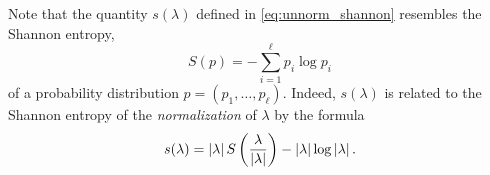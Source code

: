 \documentclass[notitlepage, 10pt]{article}
\begin{document}
\begin{rem}
    Note that the quantity $s(\lambda)$ defined in \cref{eq:unnorm_shannon} resembles the Shannon entropy,
    \begin{equation}
        S(p) = -\sum_{i=1}^{\ell} p_i \log p_i
    \end{equation}
    of a probability distribution $p = (p_1, \ldots, p_\ell)$.
    Indeed, $s(\lambda)$ is related to the Shannon entropy of the \textit{normalization} of $\lambda$ by the formula
    \begin{equation}
        \label{eq:little_s_relation}
        s(\lambda) = \left|\lambda\right| S\left(\frac{\lambda}{\left|\lambda\right|}\right) - \left|\lambda\right| \log \left|\lambda\right|.
    \end{equation}
\end{rem}
\end{document}
